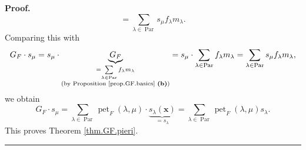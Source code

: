 \documentclass[numbers=enddot,12pt,final,onecolumn,notitlepage]{scrartcl}%
\theoremstyle{definition}
\newenvironment{proof}[1][Proof]{\noindent\textbf{#1.} }{\ \rule{0.5em}{0.5em}}
\let\sumnonlimits\sum
\renewcommand{\sum}{\sumnonlimits\limits}
\newenvironment{verlong}{}{}
\begin{document}
\begin{verlong}
\begin{proof}
\[=\sum_{\lambda\in\operatorname*{Par}}s_{\mu}f_{\lambda}m_{\lambda}.
\]
Comparing this with%
\[
G_{F}\cdot s_{\mu}=s_{\mu}\cdot\underbrace{G_{F}}_{\substack{=\sum_{\lambda
\in\operatorname*{Par}}f_{\lambda}m_{\lambda}\\\text{(by Proposition
\ref{prop.GF.basics} \textbf{(b)})}}}=s_{\mu}\cdot\sum_{\lambda\in
\operatorname*{Par}}f_{\lambda}m_{\lambda}=\sum_{\lambda\in\operatorname*{Par}%
}s_{\mu}f_{\lambda}m_{\lambda},
\]
we obtain
\[
G_{F}\cdot s_{\mu}=\sum_{\lambda\in\operatorname*{Par}}\operatorname*{pet}%
\nolimits_{F}\left(  \lambda,\mu\right)  \cdot\underbrace{s_{\lambda}\left(
\mathbf{x}\right)  }_{=s_{\lambda}}=\sum_{\lambda\in\operatorname*{Par}%
}\operatorname*{pet}\nolimits_{F}\left(  \lambda,\mu\right)  s_{\lambda}.
\]
This proves Theorem \ref{thm.GF.pieri}.
\end{proof}


\end{verlong}
\end{document}
